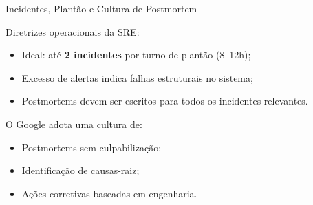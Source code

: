\documentclass[9pt]{beamer}
\begin{document}
\begin{frame}{Incidentes, Plantão e Cultura de Postmortem}

Diretrizes operacionais da SRE:
\begin{itemize}
    \item Ideal: até \textbf{2 incidentes} por turno de plantão (8–12h);
    \item Excesso de alertas indica falhas estruturais no sistema;
    \item Postmortems devem ser escritos para todos os incidentes relevantes.
\end{itemize}

O Google adota uma cultura de:
\begin{itemize}
    \item Postmortems sem culpabilização;
    \item Identificação de causas-raiz;
    \item Ações corretivas baseadas em engenharia.
\end{itemize}

\end{frame}
\end{document}
